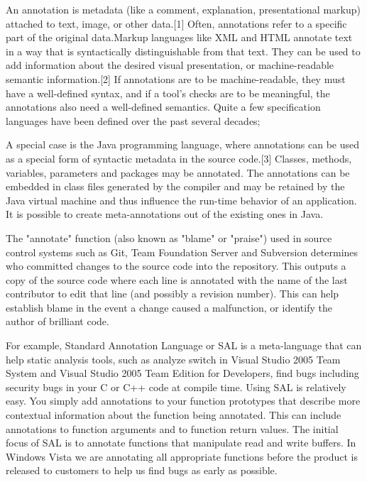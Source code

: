 An annotation is metadata (like a comment, explanation, presentational markup) attached to text, image, or other data.[1] Often, annotations refer to a specific part of the original data.Markup languages like XML and HTML annotate text in a way that is syntactically distinguishable from that text. They can be used to add information about the desired visual presentation, or machine-readable semantic information.[2] If annotations are to be machine-readable, they must have a well-defined syntax, and if a tool's checks are to be meaningful, the annotations also need a well-defined semantics. Quite a few specification languages have been defined over the past several decades; 

A special case is the Java programming language, where annotations can be used as a special form of syntactic metadata in the source code.[3] Classes, methods, variables, parameters and packages may be annotated. The annotations can be embedded in class files generated by the compiler and may be retained by the Java virtual machine and thus influence the run-time behavior of an application. It is possible to create meta-annotations out of the existing ones in Java.

The "annotate" function (also known as "blame" or "praise") used in source control systems such as Git, Team Foundation Server and Subversion determines who committed changes to the source code into the repository. This outputs a copy of the source code where each line is annotated with the name of the last contributor to edit that line (and possibly a revision number). This can help establish blame in the event a change caused a malfunction, or identify the author of brilliant code.

For example, Standard Annotation Language or SAL \cite{ref_51_microsoft:sal} is a meta-language that can help static analysis tools, such as analyze switch in Visual Studio 2005 Team System and Visual Studio 2005 Team Edition for Developers, find bugs including security bugs in your C or C++ code at compile time.
Using SAL is relatively easy. You simply add annotations to your function prototypes that describe more contextual information about the function being annotated. This can include annotations to function arguments and to function return values. The initial focus of SAL is to annotate functions that manipulate read and write buffers. In Windows Vista we are annotating all appropriate functions before the product is released to customers to help us find bugs as early as possible.

